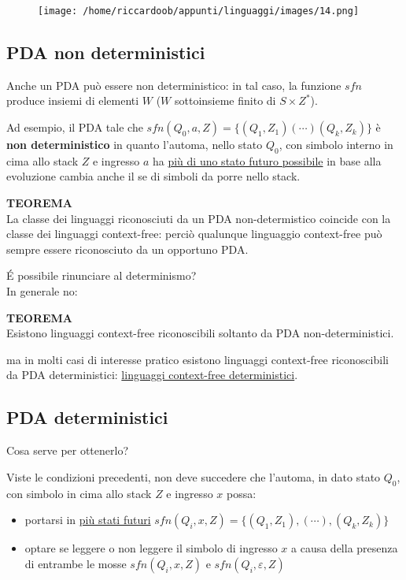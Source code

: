 \begin{figure}[H]
    \centering
    \texttt{[image: /home/riccardoob/appunti/linguaggi/images/14.png]}
\end{figure}

\subsection{PDA non deterministici}
Anche un PDA può essere non deterministico: in tal caso, la funzione $sfn$ produce insiemi di elementi $W$ ($W$ sottoinsieme finito di $S \times Z^*$).

Ad esempio, il PDA tale che $sfn(Q_0, a, Z) = \{(Q_1, Z_1)(\cdots)(Q_k, Z_k)\}$ è \textbf{non deterministico} in quanto l'automa, nello stato $Q_0$, con simbolo interno in cima allo stack $Z$ e ingresso $a$ ha \underline{più di uno stato futuro possibile} in base alla evoluzione cambia anche il se di simboli da porre nello stack.

\noindent
\textbf{TEOREMA}\\
La classe dei linguaggi riconosciuti da un PDA non-determistico coincide con la classe dei linguaggi context-free: perciò qualunque linguaggio context-free può sempre essere riconosciuto da un opportuno PDA.

É possibile rinunciare al determinismo?\\
In generale no:

\noindent
\textbf{TEOREMA}\\
Esistono linguaggi context-free riconoscibili soltanto da PDA non-deterministici.

ma in molti casi di interesse pratico esistono linguaggi context-free riconoscibili da PDA deterministici: \underline{linguaggi context-free deterministici}. 


\subsection{PDA deterministici}
Cosa serve per ottenerlo?

Viste le condizioni precedenti, non deve succedere che l'automa, in dato stato $Q_0$, con simbolo in cima allo stack $Z$ e ingresso $x$ possa:
\begin{itemize}
    \item portarsi in \underline{più stati futuri} 
        $sfn(Q_i, x, Z) = \{(Q_1, Z_1), (\cdots), (Q_k, Z_k)\}$
    \item optare se leggere o non leggere il simbolo di ingresso $x$ a causa della presenza di entrambe le mosse $sfn(Q_i, x, Z)$ e $sfn(Q_i, \varepsilon, Z)$
\end{itemize}

